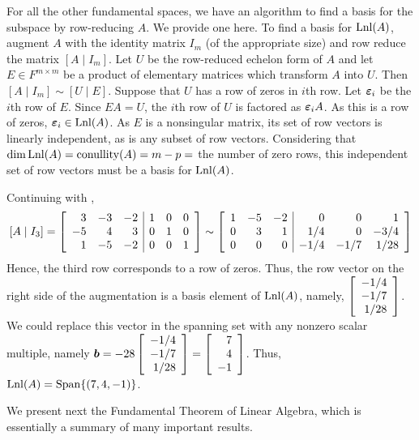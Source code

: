 For all the other fundamental spaces, we have an algorithm to find a basis for the subspace by row-reducing $A$. We provide one here. To find a basis for $\lnl(A)$, augment $A$ with the identity matrix $I_m$ (of the appropriate size) and row reduce the matrix $[ A \mid I_m]$. Let $U$ be the row-reduced echelon form of $A$ and let $E \in F^{m\times m}$ be a product of elementary matrices which transform $A$ into $U$. Then $[A\mid I_m] \sim [U \mid E]$. Suppose that $U$ has a row of zeros in $i$th row.  Let $\bb \varepsilon_i$ be the $i$th row of $E$. Since $EA = U$, the $i$th row of $U$ is factored as $\bb\varepsilon_iA$. As this is a row of zeros, $\bb\varepsilon_i\in \lnl(A)$. As $E$ is a nonsingular matrix, its set of row vectors is linearly independent, as is any subset of row vectors. Considering that $\dim\lnl(A) = \conullity(A) = m-p =$ the number of zero rows, this independent set of row vectors must be a basis for $\lnl(A)$.\\

\begin{Exam} Continuing with , 
\[[A\mid I_3] = \mtx{rrr|rrr}{3&-3&-2&1&0&0\\-5&4&3&0&1&0\\1&-5&-2&0&0&1} \sim \mtx{rrr|rrr}{1&-5&-2&0&0&1\\0&3&1&1/4&0&-3/4\\0&0&0&-1/4&-1/7&1/28}\]
Hence, the third row corresponds to a row of zeros. Thus, the row vector on the right side of the augmentation is a basis element of $\lnl(A)$, namely, $\vr{-1/4\\-1/7\\1/28}$. We could replace this vector in the spanning set with any nonzero scalar multiple, namely $\bb b= -28\vr{-1/4\\-1/7\\1/28} = \vr{7\\4\\-1}$. Thus, $\lnl(A) = \Span\{(7, 4, -1)\}$.
\end{Exam}\vs

We present next the Fundamental Theorem of Linear Algebra, which is essentially a summary of many important results.\\

